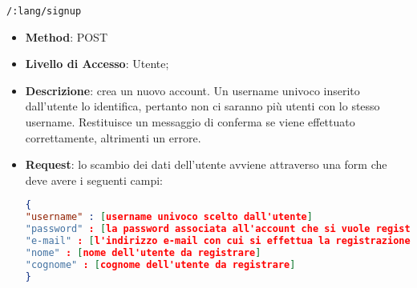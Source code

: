 	\item \texttt{/:lang/signup}
		\begin{itemize}
			\item \textbf{Method}: POST
			\item \textbf{Livello di Accesso}: Utente;
			\item \textbf{Descrizione}: crea un nuovo account. Un username univoco inserito dall'utente lo identifica, pertanto non ci saranno più utenti con lo stesso username. Restituisce un messaggio di conferma se viene effettuato correttamente, altrimenti un errore.
			\item \textbf{Request}: lo scambio dei dati dell'utente avviene attraverso una form che deve avere i seguenti campi:
\begin{lstlisting}[language=json,firstnumber=1]
{
"username" : [username univoco scelto dall'utente]
"password" : [la password associata all'account che si vuole registrare]
"e-mail" : [l'indirizzo e-mail con cui si effettua la registrazione]
"nome" : [nome dell'utente da registrare]
"cognome" : [cognome dell'utente da registrare]
}
\end{lstlisting}
		\end{itemize}